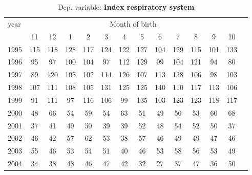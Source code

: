  \begin{table}[H] \begin{threeparttable} \centering \caption{Dep. variable: \textbf{Index respiratory system}} {\def\sym#1{\ifmmode^{#1}\else\(^{#1}\)\fi} \begin{tabular}{l*{13}{c}} \toprule year & \multicolumn{12}{c}{Month of birth} \\ \cmidrule(lr){2-13} 
            &          11&          12&           1&           2&           3&           4&           5&           6&           7&           8&           9&          10\\
1995        &         115&         118&         128&         117&         124&         122&         127&         104&         129&         115&         101&         133\\
1996        &          95&          97&         100&         104&          97&         112&         129&          99&         104&         121&          94&          80\\
1997        &          89&         120&         105&         102&         114&         126&         107&         113&         138&         106&          98&         103\\
1998        &         107&         111&         108&         105&         131&         125&         125&         140&         110&         117&         113&         106\\
1999        &          91&         111&          97&         116&         106&          99&         135&         103&         123&         123&         118&         117\\
2000        &          48&          66&          54&          59&          54&          63&          51&          49&          56&          53&          60&          68\\
2001        &          37&          41&          49&          50&          39&          39&          52&          48&          54&          52&          50&          37\\
2002        &          46&          42&          57&          62&          53&          38&          57&          46&          49&          49&          47&          46\\
2003        &          55&          46&          53&          54&          51&          40&          46&          53&          58&          56&          53&          49\\
2004        &          34&          38&          48&          46&          47&          42&          32&          27&          37&          47&          36&          50\\

\end{tabular}}
\end{threeparttable}
\end{table}
